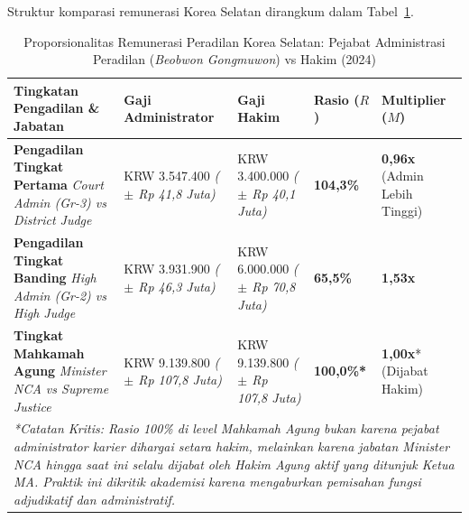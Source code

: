 \documentclass[12pt, a4paper]{article}
\begin{document}
Struktur komparasi remunerasi Korea Selatan dirangkum dalam Tabel~\ref{tab:komparasi-korsel-lengkap}.

\begin{table}[H]
\centering
\fontsize{9}{11}\selectfont
\caption{Proporsionalitas Remunerasi Peradilan Korea Selatan: Pejabat Administrasi Peradilan (\textit{Beobwon Gongmuwon}) vs Hakim (2024)}
\label{tab:komparasi-korsel-lengkap}
\renewcommand{\arraystretch}{1.35}
\begin{tabular}{p{5.0cm} p{2.7cm} p{2.7cm} p{1.7cm} p{1.7cm}}
\hline
\textbf{Tingkatan Pengadilan \& Jabatan} & \textbf{Gaji Administrator} & \textbf{Gaji Hakim} & \textbf{Rasio ($R$)} & \textbf{Multiplier ($M$)} \tabularnewline
\hline
\raggedright\textbf{Pengadilan Tingkat Pertama} \newline \textit{Court Admin (Gr-3) vs District Judge} & KRW 3.547.400 \newline \textit{($\pm$ Rp 41,8 Juta)} & KRW 3.400.000 \newline \textit{($\pm$ Rp 40,1 Juta)} & \textbf{104,3\%} & \textbf{0,96x} (Admin Lebih Tinggi) \tabularnewline
\raggedright\textbf{Pengadilan Tingkat Banding} \newline \textit{High Admin (Gr-2) vs High Judge} & KRW 3.931.900 \newline \textit{($\pm$ Rp 46,3 Juta)} & KRW 6.000.000 \newline \textit{($\pm$ Rp 70,8 Juta)} & \textbf{65,5\%} & \textbf{1,53x} \tabularnewline
\raggedright\textbf{Tingkat Mahkamah Agung} \newline \textit{Minister NCA vs Supreme Justice} & KRW 9.139.800 \newline \textit{($\pm$ Rp 107,8 Juta)} & KRW 9.139.800 \newline \textit{($\pm$ Rp 107,8 Juta)} & \textbf{100,0\%*} & \textbf{1,00x}* (Dijabat Hakim) \tabularnewline
\hline
\multicolumn{5}{p{13.8cm}}{\textit{*Catatan Kritis: Rasio 100\% di level Mahkamah Agung bukan karena pejabat administrator karier dihargai setara hakim, melainkan karena jabatan Minister NCA hingga saat ini selalu dijabat oleh Hakim Agung aktif yang ditunjuk Ketua MA. Praktik ini dikritik akademisi karena mengaburkan pemisahan fungsi adjudikatif dan administratif.}} \tabularnewline
\hline
\end{tabular}
\end{table}
\end{document}
